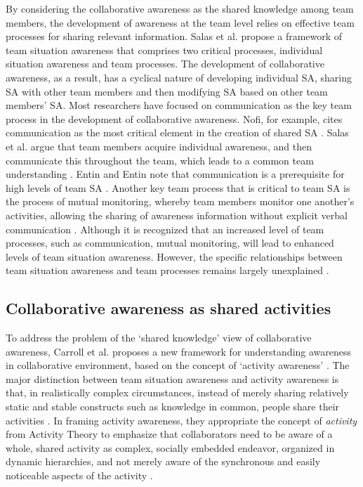 By considering the collaborative awareness as the shared knowledge among team members, the development of awareness at the team level relies on effective team processes for sharing relevant information. Salas et al. \cite{salas1995situation} propose a framework of team situation awareness that comprises two critical processes, individual situation awareness and team processes. The development of collaborative awareness, as a result, has a cyclical nature of developing individual SA, sharing SA with other team members and then modifying SA based on other team members’ SA. Most researchers have focused on communication as the key team process in the development of collaborative awareness. Nofi, for example, cites communication as the most critical element in the creation of shared SA \cite{nofi2000defining}. Salas et al. argue that team members acquire individual awareness, and then communicate this throughout the team, which leads to a common team understanding \cite{salas1995situation}. Entin and Entin note that communication is a prerequisite for high levels of team SA \cite{entin2000assessing}. Another key team process that is critical to team SA is the process of mutual monitoring, whereby team members monitor one another's activities, allowing the sharing of awareness information without explicit verbal communication \cite{Gutwin2002,Salmon2008}. Although it is recognized that an increased level of team processes, such as communication, mutual monitoring, will lead to enhanced levels of team situation awareness. However, the specific relationships between team situation awareness and team processes remains largely unexplained \cite{Salmon2008}.

\subsection{Collaborative awareness as shared activities} %
\label{sub:activity_awareness}
To address the problem of the `shared knowledge' view of collaborative awareness, Carroll et al. proposes a new framework for understanding awareness in collaborative environment, based on the concept of `activity awareness' \cite{carroll2003a,carroll2006a}. The major distinction between team situation awareness and activity awareness is that, in realistically complex circumstances, instead of merely sharing relatively static and stable constructs such as knowledge in common, people share their activities \cite{carroll2006a}. In framing activity awareness, they appropriate the concept of \emph{activity} from Activity Theory to emphasize that collaborators need to be aware of a whole, shared activity as complex, socially embedded endeavor, organized in dynamic hierarchies, and not merely aware of the synchronous and easily noticeable aspects of the activity \cite{Carroll2009}. 

